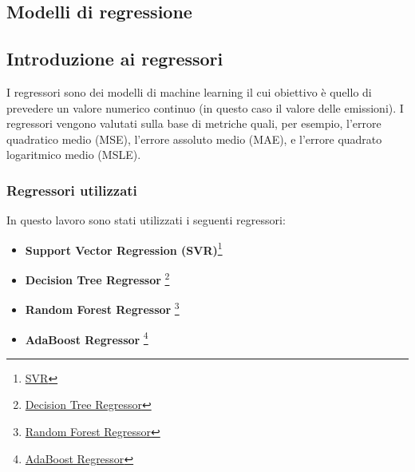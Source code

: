 \subsection{Modelli di regressione}
\subsection{Introduzione ai regressori}
I regressori sono dei modelli di machine learning il cui obiettivo è quello di prevedere un valore numerico continuo (in questo caso il valore delle emissioni).
I regressori vengono valutati sulla base di metriche quali, per esempio, l'errore quadratico medio (MSE), l'errore assoluto medio (MAE), e l'errore quadrato logaritmico medio (MSLE).

\subsubsection{Regressori utilizzati}
In questo lavoro sono stati utilizzati i seguenti regressori:
\begin{itemize}
    \item \textbf{Support Vector Regression (SVR)}\footnote{\href{https://scikit-learn.org/stable/modules/generated/sklearn.svm.SVR.html}{SVR}}{}
    \item \textbf{Decision Tree Regressor} \footnote{\href{https://scikit-learn.org/stable/modules/generated/sklearn.tree.DecisionTreeRegressor.html}{Decision Tree Regressor}}{}
    \item \textbf{Random Forest Regressor} \footnote{\href{https://scikit-learn.org/stable/modules/generated/sklearn.ensemble.RandomForestRegressor.html}{Random Forest Regressor}}{}
    \item \textbf{AdaBoost Regressor} \footnote{\href{https://scikit-learn.org/stable/modules/generated/sklearn.ensemble.AdaBoostRegressor.html}{AdaBoost Regressor}}{}
\end{itemize}

